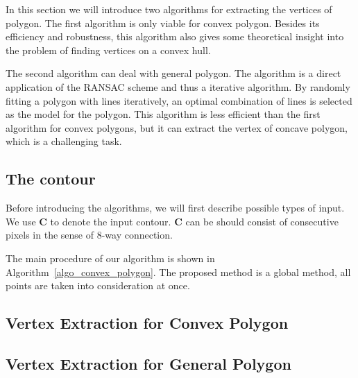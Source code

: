 \documentclass{article}
\begin{document}
In this section we will introduce two algorithms for extracting the vertices of polygon.
The first algorithm is only viable for convex polygon. Besides its efficiency and robustness,
this algorithm also gives some theoretical insight into the problem of finding vertices on a convex hull.

The second algorithm can deal with general polygon.
The algorithm is a direct application of the RANSAC scheme and thus a iterative algorithm.
By randomly fitting a polygon with lines iteratively, an optimal combination of lines is selected
as the model for the polygon. This algorithm is less efficient than the first algorithm for convex polygons,
but it can extract the vertex of concave polygon, which is a challenging task.


\subsection{The contour}
\label{sub:The contour}

Before introducing the algorithms, we will first describe possible types of input.
We use $\mathbf{C}$ to denote the input contour. $\mathbf{C}$ can be
should consist of consecutive pixels in the sense of 8-way connection. %

The main procedure of our algorithm is shown in Algorithm~\ref{algo_convex_polygon}.
The proposed method is a global method, all points are taken into consideration at once.

\subsection{Vertex Extraction for Convex Polygon}
\label{sec:Vertex Extraction for Convex Polygon}


\subsection{Vertex Extraction for General Polygon}
\label{sec:Vertex Extraction for General Polygon}
\end{document}
